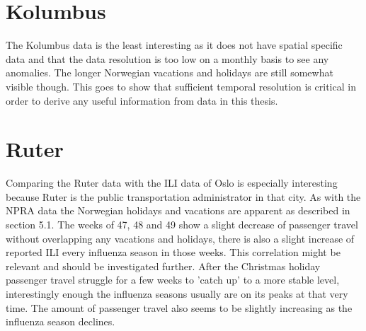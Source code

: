 \section{Kolumbus}
The Kolumbus data is the least interesting as it does not have spatial specific data and that the data resolution is too low on a monthly basis to see any anomalies. The longer Norwegian vacations and holidays are still somewhat visible though. This goes to show that sufficient temporal resolution is critical in order to derive any useful information from data in this thesis.




\section{Ruter}
Comparing the Ruter data with the ILI data of Oslo is especially interesting because Ruter is the public transportation administrator in that city. As with the NPRA data the Norwegian holidays and vacations are apparent as described in section 5.1. The weeks of 47, 48 and 49 show a slight decrease of passenger travel without overlapping any vacations and holidays, there is also a slight increase of reported ILI every influenza season in those weeks. This correlation might be relevant and should be investigated further.
After the Christmas holiday passenger travel struggle for a few weeks to 'catch up' to a more stable level, interestingly enough the influenza seasons usually are on its peaks at that very time.
The amount of passenger travel also seems to be slightly increasing as the influenza season declines.